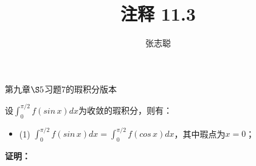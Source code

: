 \documentclass{article}
\begin{document}
\title{注释 11.3}
\author{张志聪}
\maketitle

\begin{zremark}
  第九章$\S 5$习题7的瑕积分版本

  设$\int_{0}^{\pi/2} f(sin \, x) dx$为收敛的瑕积分，则有：
  \begin{itemize}
    \item (1) $\int_{0}^{\pi/2} f(sin \, x) dx = \int_{0}^{\pi/2} f(cos \, x) dx$，其中瑕点为$x = 0$；
  \end{itemize}
\end{zremark}
\textbf{证明：}
\end{document}
